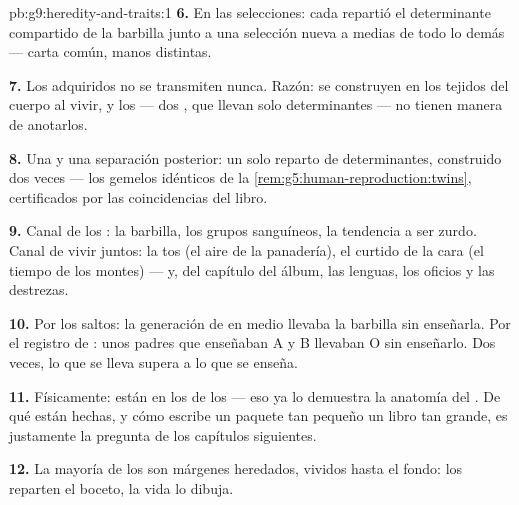 \begin{solution}{pb:g9:heredity-and-traits:1}
\textbf{6.} En las selecciones: cada  repartió el
determinante compartido de la barbilla junto a una selección nueva a
medias de todo lo demás --- carta común, manos distintas.

\textbf{7.} Los  adquiridos no se transmiten nunca. Razón: se
construyen en los tejidos del cuerpo al vivir, y los  --- dos
, que llevan solo determinantes --- no tienen manera de
anotarlos.

\textbf{8.} Una  y una separación posterior: un solo reparto
de determinantes, construido dos veces --- los gemelos idénticos de la
\cref{rem:g5:human-reproduction:twins}, certificados por las
coincidencias del libro.

\textbf{9.} Canal de los : la barbilla, los grupos sanguíneos,
la tendencia a ser zurdo. Canal de vivir juntos: la tos (el aire de la
panadería), el curtido de la cara (el tiempo de los montes) --- y, del
capítulo del álbum, las lenguas, los oficios y las destrezas.

\textbf{10.} Por los saltos: la generación de en medio llevaba la
barbilla sin enseñarla. Por el registro de : unos padres que
enseñaban A y B llevaban O sin enseñarlo. Dos veces, lo que se lleva
supera a lo que se enseña.

\textbf{11.} Físicamente: están en los  de los  --- eso
ya lo demuestra la anatomía del . De qué están hechas, y
cómo escribe un paquete tan pequeño un libro tan grande, es
justamente la pregunta de los capítulos siguientes.

\textbf{12.} La mayoría de los  son márgenes heredados, vividos
hasta el fondo: los  reparten el boceto, la vida lo dibuja.
\end{solution}
